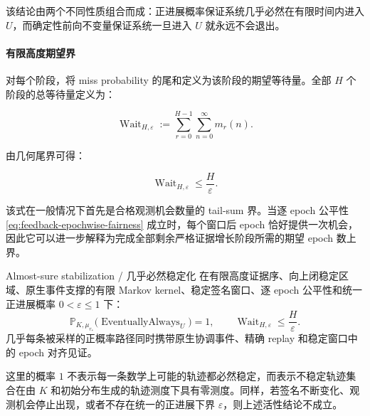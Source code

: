     该结论由两个不同性质组合而成：正进展概率保证系统几乎必然在有限时间内进入 $U$，而确定性前向不变量保证系统一旦进入 $U$ 就永远不会退出。

    \paragraph{有限高度期望界}

    对每个阶段，将 miss probability 的尾和定义为该阶段的期望等待量。全部 $H$ 个阶段的总等待量定义为：

    \begin{equation}
      \boxed{
        \operatorname{Wait}_{H,\varepsilon}
        :=
        \sum_{r=0}^{H-1}
        \sum_{n=0}^{\infty}
        m_r(n).
      }
      \label{eq:feedback-expected-wait-definition}
    \end{equation}

    由几何尾界可得：

    \begin{equation}
      \boxed{
        \operatorname{Wait}_{H,\varepsilon}
        \le
        \frac{H}{\varepsilon}.
      }
      \label{eq:feedback-expected-epoch-bound}
    \end{equation}

    该式在一般情况下首先是合格观测机会数量的 tail-sum 界。当逐 epoch 公平性
    \eqref{eq:feedback-epochwise-fairness} 成立时，每个窗口后 epoch 恰好提供一次机会，因此它可以进一步解释为完成全部剩余严格证据增长阶段所需的期望 epoch 数上界。

    \begin{MWCallout}[MWLilac]{Almost-sure stabilization / 几乎必然稳定化}
      在有限高度证据序、向上闭稳定区域、原生事件支撑的有限 Markov
      kernel、稳定签名窗口、逐 epoch 公平性和统一正进展概率
      $0<\varepsilon\le1$ 下：
      \begin{equation}
        \mathbb P_{K,\mu_{r_\ast}}
        \bigl(
          \operatorname{EventuallyAlways}_{U}
        \bigr)
        =1,
        \qquad
        \operatorname{Wait}_{H,\varepsilon}
        \le
        \frac{H}{\varepsilon}.
        \label{eq:feedback-stabilization-summary}
      \end{equation}
      几乎每条被采样的正概率路径同时携带原生协调事件、精确 replay
      和稳定窗口中的 epoch 对齐见证。
    \end{MWCallout}

    这里的概率 $1$ 不表示每一条数学上可能的轨迹都必然稳定，而表示不稳定轨迹集合在由 $K$ 和初始分布生成的轨迹测度下具有零测度。同样，若签名不断变化、观测机会停止出现，或者不存在统一的正进展下界 $\varepsilon$，则上述活性结论不成立。

